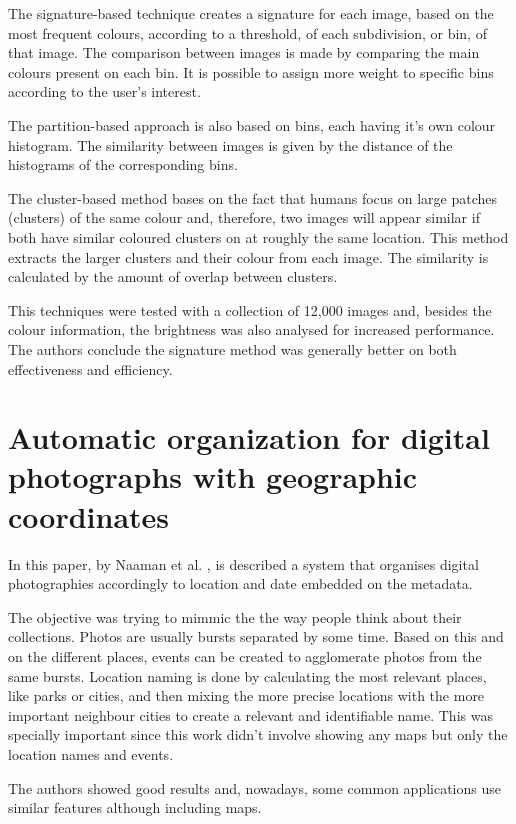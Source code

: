 The signature-based technique creates a signature for each image, based on the most frequent colours, according to a threshold, of each subdivision, or bin, of that image. The comparison between images is made by comparing the main colours present on each bin. It is possible to assign more weight to specific bins according to the user's interest.

The partition-based approach is also based on bins, each having it's own colour histogram. The similarity between images is given by the distance of the histograms of the corresponding bins.

The cluster-based method bases on the fact that humans focus on large patches (clusters) of the same colour and, therefore, two images will appear similar if both have similar coloured clusters on at roughly the same location. This method extracts the larger clusters and their colour from each image. The similarity is calculated by the amount of overlap between clusters.

This techniques were tested with a collection of 12,000 images and, besides the colour information, the brightness was also analysed for increased performance. The authors conclude the signature method was generally better on both effectiveness and efficiency.


\section{Automatic organization for digital photographs with geographic coordinates} %
\label{sub:Naaman}

In this paper, by Naaman et al. \cite{Naaman:2004p1802}, is described a system that organises digital photographies accordingly to location and date embedded on the metadata.

The objective was trying to mimmic the the way people think about their collections. Photos are usually bursts separated by some time. Based on this and on the different places, events can be created to agglomerate photos from the same bursts. Location naming is done by calculating the most relevant places, like parks or cities, and then mixing the more precise locations with the more important neighbour cities to create a relevant and identifiable name. This was specially important since this work didn't involve showing any maps but only the location names and events.

The authors showed good results and, nowadays, some common applications use similar features although including maps.

